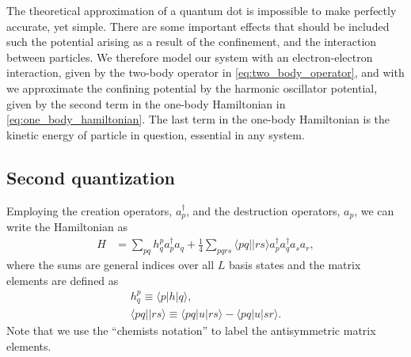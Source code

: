 \documentclass[
    a4paper, aps, twocolumn, floatfix, superscriptaddress,
    nofootinbib]{revtex4-1}
\newcommand{\1}{\mathds{1}}
\newcommand{\bra}[1]{\langle #1\lvert}
\newcommand{\ket}[1]{\rvert #1\rangle}
\newcommand{\acr}[1]{a_{#1}^{\dagger}}
\newcommand{\ade}[1]{a_{#1}}
\begin{document}
        The theoretical approximation of a quantum dot is impossible to make perfectly
        accurate, yet simple. There are some important effects that should be
        included such the potential arising as a result of the confinement, and
        the interaction between particles. We therefore model our system with an
        electron-electron interaction, given by the two-body operator in
        \autoref{eq:two_body_operator}, and with we approximate the confining
        potential by the harmonic oscillator potential, given by the second term
        in the one-body Hamiltonian in \autoref{eq:one_body_hamiltonian}. The
        last term in the one-body Hamiltonian is the kinetic energy of particle
        in question, essential in any system.  

    \subsection{Second quantization}
        Employing the creation operators, $\acr{p}$, and the destruction
        operators, $\ade{p}$, we can write the Hamiltonian as
        \begin{align}
            H
            &=
            \sum_{pq}h_{q}^{p}\acr{p}\ade{q}
            + \frac{1}{4}\sum_{pqrs}\bra{pq}\ket{rs}\acr{p}\acr{q}\ade{s}\ade{r},
        \end{align}
        where the sums are general indices over all $L$ basis states and the
        matrix elements are defined as
        \begin{gather}
            h^{p}_{q} \equiv \bra{p}h\ket{q}, \\
            \bra{pq}\ket{rs} \equiv \bra{pq}u\ket{rs} - \bra{pq}u\ket{sr}.
        \end{gather}
        Note that we use the ``chemists notation'' to label the antisymmetric matrix
        elements.
\end{document}

